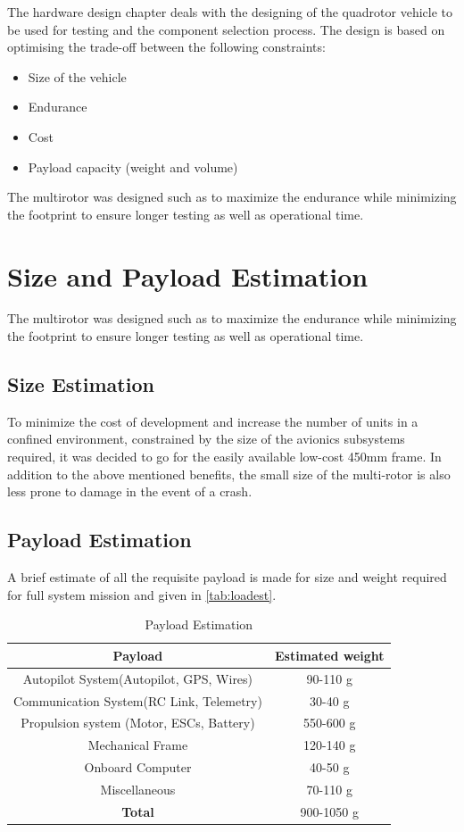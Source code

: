 \begin{spacing}{2}
The hardware design chapter deals with the designing of the quadrotor vehicle to be used for testing and the component selection process. The design is based on optimising the trade-off between the following constraints:
\begin{itemize}
    \item Size of the vehicle
    \item Endurance
    \item Cost
    \item Payload capacity (weight and volume)
\end{itemize}
The multirotor was designed such as to maximize the endurance while minimizing the footprint to ensure longer testing as well as operational time. 
\section{Size and Payload Estimation}
The multirotor was designed such as to maximize the endurance while minimizing the footprint to ensure longer testing as well as operational time.
\subsection{Size Estimation}
To minimize the cost of development and increase the number of units in a confined environment, constrained by the size of the avionics subsystems required, it was decided to go for the easily available low-cost 450mm frame. In addition to the above mentioned benefits, the small size of the multi-rotor is also less prone to damage in the event of a crash.
\subsection{Payload Estimation}
A brief estimate of all the requisite payload is made for size and weight required for full system mission and given in \ref{tab:loadest}.
\begin{table}[h]
    \centering
    \caption{Payload Estimation}
    \begin{tabular}{c|c}
    \hline
        \textbf{Payload} & \textbf{Estimated weight}  \\\hline
        Autopilot System(Autopilot, GPS, Wires) & 90-110 g \\
        Communication System(RC Link, Telemetry) & 30-40 g \\
        Propulsion system (Motor, ESCs, Battery) & 550-600 g \\
        Mechanical Frame & 120-140 g\\
        Onboard Computer & 40-50 g\\
        Miscellaneous & 70-110 g\\\hline
        \textbf{Total} & 900-1050 g\\\hline
    \end{tabular}
    

\end{table}
\end{spacing}
